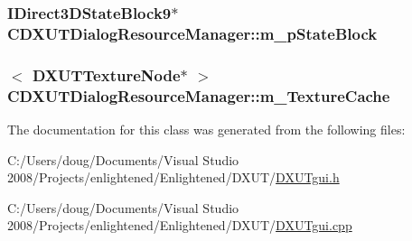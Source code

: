 \label{class_c_d_x_u_t_dialog_resource_manager_a36b8710e919e00692dbfd4683b2529eb}
\hypertarget{class_c_d_x_u_t_dialog_resource_manager_a68ecba684cf15356604fa77dd6ade31f}{
\subsubsection[{m\_\-pStateBlock}]{\setlength{\rightskip}{0pt plus 5cm}IDirect3DStateBlock9$\ast$ {\bf CDXUTDialogResourceManager::m\_\-pStateBlock}}}
\label{class_c_d_x_u_t_dialog_resource_manager_a68ecba684cf15356604fa77dd6ade31f}
\hypertarget{class_c_d_x_u_t_dialog_resource_manager_a9a419eb0e0277ed4b211ea698c86404d}{
\subsubsection[{m\_\-TextureCache}]{$<$ {\bf DXUTTextureNode}$\ast$ $>$ {\bf CDXUTDialogResourceManager::m\_\-TextureCache}}}
\label{class_c_d_x_u_t_dialog_resource_manager_a9a419eb0e0277ed4b211ea698c86404d}


The documentation for this class was generated from the following files:\begin{DoxyCompactItemize}
\item 
C:/Users/doug/Documents/Visual Studio 2008/Projects/enlightened/Enlightened/DXUT/\hyperlink{_d_x_u_tgui_8h}{DXUTgui.h}\item 
C:/Users/doug/Documents/Visual Studio 2008/Projects/enlightened/Enlightened/DXUT/\hyperlink{_d_x_u_tgui_8cpp}{DXUTgui.cpp}\end{DoxyCompactItemize}

